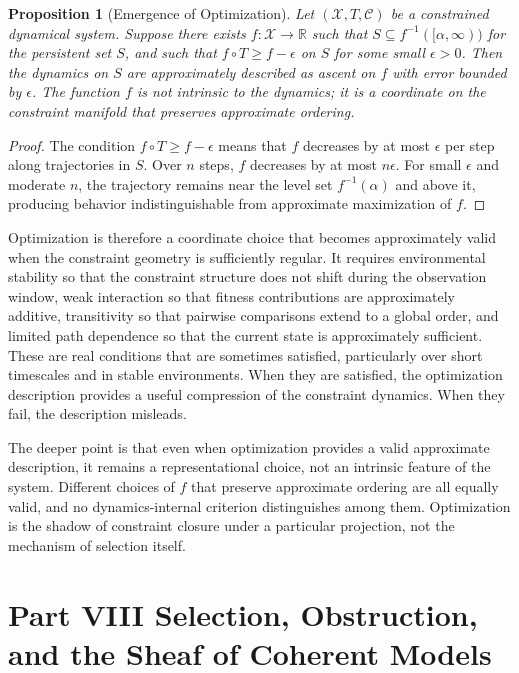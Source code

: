 \documentclass[12pt, a4paper, oneside]{article}
\theoremstyle{plain}
\newtheorem{proposition}[theorem]{Proposition}
\theoremstyle{definition}
\theoremstyle{remark}
\newcommand{\X}{\mathcal{X}}
\newcommand{\C}{\mathcal{C}}
\newcommand{\T}{T}
\begin{document}
\begin{proposition}[Emergence of Optimization]
\label{prop:opt-emergence}
Let $(\X, \T, \C)$ be a constrained dynamical system. Suppose there exists $f : \X \to \mathbb{R}$ such that $S \subseteq f^{-1}([\alpha, \infty))$ for the persistent set $S$, and such that $f \circ \T \geq f - \epsilon$ on $S$ for some small $\epsilon > 0$. Then the dynamics on $S$ are approximately described as ascent on $f$ with error bounded by $\epsilon$. The function $f$ is not intrinsic to the dynamics; it is a coordinate on the constraint manifold that preserves approximate ordering.
\end{proposition}

\begin{proof}
The condition $f \circ \T \geq f - \epsilon$ means that $f$ decreases by at most $\epsilon$ per step along trajectories in $S$. Over $n$ steps, $f$ decreases by at most $n\epsilon$. For small $\epsilon$ and moderate $n$, the trajectory remains near the level set $f^{-1}(\alpha)$ and above it, producing behavior indistinguishable from approximate maximization of $f$.
\end{proof}

Optimization is therefore a coordinate choice that becomes approximately valid when the constraint geometry is sufficiently regular. It requires environmental stability so that the constraint structure does not shift during the observation window, weak interaction so that fitness contributions are approximately additive, transitivity so that pairwise comparisons extend to a global order, and limited path dependence so that the current state is approximately sufficient. These are real conditions that are sometimes satisfied, particularly over short timescales and in stable environments. When they are satisfied, the optimization description provides a useful compression of the constraint dynamics. When they fail, the description misleads.

The deeper point is that even when optimization provides a valid approximate description, it remains a representational choice, not an intrinsic feature of the system. Different choices of $f$ that preserve approximate ordering are all equally valid, and no dynamics-internal criterion distinguishes among them. Optimization is the shadow of constraint closure under a particular projection, not the mechanism of selection itself.

\section*{Part VIII \quad Selection, Obstruction, and the Sheaf of Coherent Models}
\end{document}
